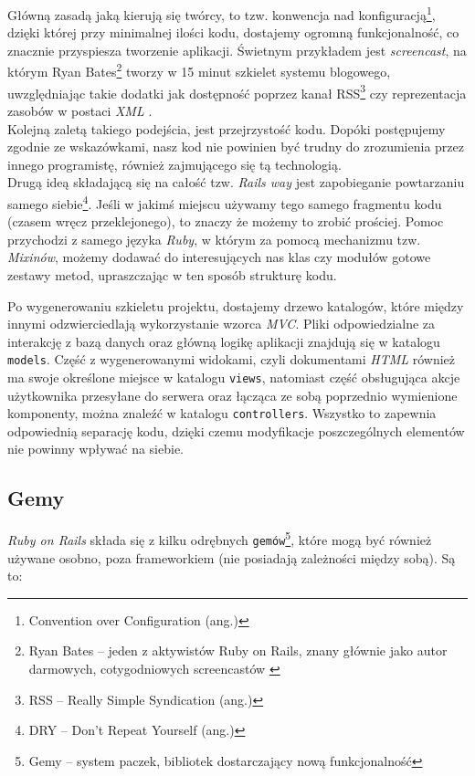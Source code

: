 \documentclass[12pt,twoside]{report}
\begin{document}
Główną zasadą jaką kierują się twórcy, to tzw. konwencja nad
konfiguracją\footnote{Convention over Configuration (ang.)}, dzięki której przy minimalnej
ilości kodu, dostajemy ogromną funkcjonalność, co znacznie przyspiesza tworzenie
aplikacji. Świetnym przykładem jest \emph{screencast}, na którym Ryan
Bates\footnote{Ryan Bates -- jeden z aktywistów Ruby on Rails, znany głównie jako autor
darmowych, cotygodniowych screencastów \cite{ryan-bates}} tworzy w 15 minut szkielet
systemu blogowego, uwzględniając takie dodatki jak dostępność poprzez kanał
RSS\footnote{RSS -- Really Simple Syndication (ang.)} czy reprezentacja zasobów w postaci
\emph{XML} \cite{blog-in-15-min}.\\
Kolejną zaletą takiego podejścia, jest przejrzystość kodu. Dopóki postępujemy zgodnie ze
wskazówkami, nasz kod nie powinien być trudny do zrozumienia przez innego programistę,
również zajmującego się tą technologią.\\
Drugą ideą składającą się na całość tzw. \emph{Rails way} jest zapobieganie powtarzaniu
samego siebie\footnote{DRY -- Don't Repeat Yourself (ang.)}. Jeśli w jakimś miejscu używamy
tego samego fragmentu kodu (czasem wręcz przeklejonego), to znaczy że możemy to zrobić
prościej. Pomoc przychodzi z samego języka \emph{Ruby}, w którym za pomocą mechanizmu
tzw. \emph{Mixinów}, możemy dodawać do interesujących nas klas czy modułów gotowe zestawy
metod, upraszczając w ten sposób strukturę kodu.


Po wygenerowaniu szkieletu projektu, dostajemy drzewo katalogów, które między innymi
odzwierciedlają wykorzystanie wzorca \emph{MVC}. Pliki odpowiedzialne za interakcję z
bazą danych oraz główną logikę aplikacji znajdują się w katalogu \texttt{models}. Część
z wygenerowanymi widokami, czyli dokumentami \emph{HTML} również ma swoje określone miejsce w
katalogu \texttt{views}, natomiast część obsługująca akcje użytkownika przesyłane do serwera
oraz łącząca ze sobą poprzednio wymienione komponenty, można znaleźć w
katalogu \texttt{controllers}. Wszystko to zapewnia odpowiednią separację kodu, dzięki
czemu modyfikacje poszczególnych elementów nie powinny wpływać na siebie.


\subsection{Gemy}
\emph{Ruby on Rails} składa się z kilku odrębnych \texttt{gemów}\footnote{Gemy -- system
paczek, bibliotek dostarczający nową funkcjonalność}, które mogą być również używane
osobno, poza frameworkiem (nie posiadają zależności między sobą). Są to:
\end{document}
